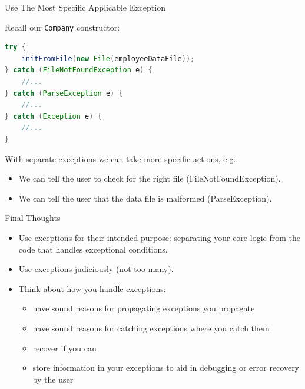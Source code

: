 \documentclass{beamer}
\begin{document}
\begin{frame}[fragile]{Use The Most Specific Applicable Exception}


Recall our {\tt Company} constructor:
\begin{lstlisting}[language=Java]
try {
    initFromFile(new File(employeeDataFile));
} catch (FileNotFoundException e) {
    //...
} catch (ParseException e) {
    //...
} catch (Exception e) {
    //...
}
\end{lstlisting}
With separate exceptions we can take more specific actions, e.g.:
\begin{itemize}
\item We can tell the user to check for the right file (FileNotFoundException).
\item We can tell the user that the data file is malformed (ParseException).
\end{itemize}


\end{frame}

\begin{frame}[fragile]{Final Thoughts}

\begin{itemize}
\item Use exceptions for their intended purpose: separating your core logic from the code that handles exceptional conditions.
\item Use exceptions judiciously (not too many).
\item Think about how you handle exceptions:
\begin{itemize}
\item have sound reasons for propagating exceptions you propagate
\item have sound reasons for catching exceptions where you catch them
\item recover if you can
\item store information in your exceptions to aid in debugging or error recovery by the user
\end{itemize}
\end{itemize}


\end{frame}







\end{document}
